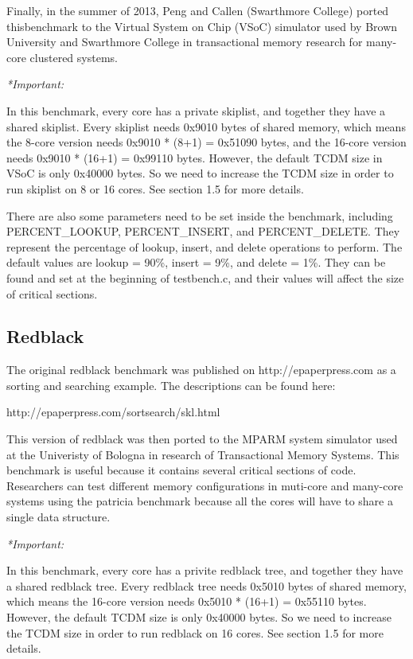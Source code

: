 \documentclass{article}
\begin{document}
Finally, in the summer of 2013, Peng and Callen (Swarthmore College) ported 
thisbenchmark to the Virtual System on Chip (VSoC) simulator used by Brown 
University and Swarthmore College in transactional memory research for 
many-core clustered systems. 

\vspace{2mm}
\emph{*Important:} 

In this benchmark, every core has a private skiplist, and together they have a
shared skiplist. Every skiplist needs 0x9010 bytes of shared memory, which 
means the 8-core version needs 0x9010 * (8+1) = 0x51090 bytes,
and the 16-core version needs 0x9010 * (16+1) = 0x99110 bytes. However, the 
default TCDM size in VSoC is only 0x40000 bytes. So we need to 
increase the TCDM size in order to run skiplist on 8 or 16 cores.
 See section 1.5 for more details.

There are also some parameters need to be set inside the benchmark, including 
 PERCENT\_LOOKUP, PERCENT\_INSERT, and PERCENT\_DELETE. They 
represent the percentage of lookup, insert, and delete operations to perform.
The default values are lookup = 90\%, insert = 9\%, and 
delete = 1\%. They can be found and set at the beginning of testbench.c,
and their values will affect the size of critical sections. 

\subsection{Redblack}


The original redblack benchmark was published on http://epaperpress.com
as a sorting and searching example. The descriptions can be found here:

http://epaperpress.com/sortsearch/skl.html

This version of redblack was then ported to the MPARM system simulator used at 
the Univeristy of Bologna in research of Transactional Memory Systems. This
benchmark is useful because it contains several critical sections of code. 
Researchers can test different memory configurations in muti-core and many-core 
systems using the patricia benchmark because all the cores will have to share a 
single data structure. 

\vspace{2mm}
\emph{*Important:} 

In this benchmark, every core has a privite redblack tree, and together they 
have a shared redblack tree. Every redblack tree needs 0x5010 bytes of shared 
memory, which means the 16-core version needs 0x5010 * (16+1) = 0x55110 bytes. 
However, the default TCDM size is only 0x40000 bytes. 
So we need to increase the TCDM size in order to run redblack on 16 cores. 
See section 1.5 for more details.
\end{document}
